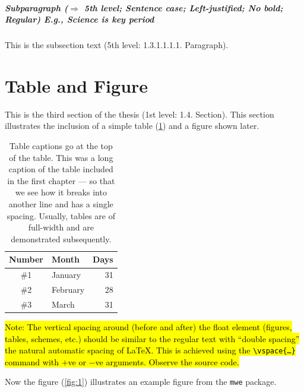 \documentclass[ms-thesis,mathdesign,12pt]{ndsu-thesis-2022}
\begin{document}
\subparagraph{Subparagraph ($\Rightarrow$ 5th level; Sentence case; Left-justified; No bold; Regular) E.g., Science is key period}
This is the subsection text (5th level: 1.3.1.1.1.1. Paragraph). \kant[7]

\section{Table and Figure}
This is the third section of the thesis (1st level: 1.4. Section). This section illustrates the inclusion of a simple table (\cref{tab:1}) and a figure shown later.

\begin{table}[h]
\centering
\caption{Table captions go at the top of the table. This was a long caption of the table included in the first chapter --- so that we see how it breaks into another line and has a single spacing. Usually, tables are of full-width and are demonstrated subsequently.}
\vspace{-1ex}
\begin{tabular}{clr}
\toprule
Number & Month & Days\\
\midrule
\#1 & January    & 31\\
\#2 & February   & 28\\
\#3 & March      & 31\\
\bottomrule
\end{tabular}
\label{tab:1}
\end{table}	

\vspace{-0.1in}
\kant[7]

\hl{Note: The vertical spacing around (before and after) the float element (figures, tables, schemes, etc.) should be similar to the regular text with ``double spacing'' the natural automatic spacing of \LaTeX. This is achieved using the \texttt{\textbackslash vspace\{\ldots\}} command with $+$ve or $-$ve arguments. Observe the source code.}

Now the figure (\cref{fig:1}) illustrates an example figure from the \texttt{mwe} package.

\vspace{-0.1in}


\vspace{-0.25in}
\kant[8-9]
\end{document}
